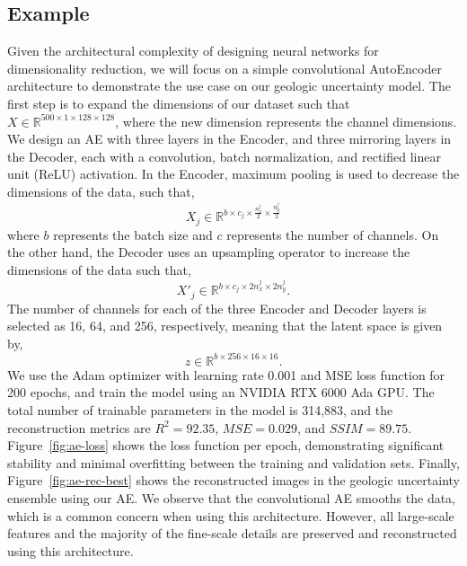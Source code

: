 \documentclass[a4paper,fleqn,12pt]{article}
\begin{document}
\subsection*{Example}
Given the architectural complexity of designing neural networks for dimensionality reduction, we will focus on a simple convolutional AutoEncoder architecture to demonstrate the use case on our geologic uncertainty model. The first step is to expand the dimensions of our dataset such that $X\in\mathbb{R}^{500\times1\times128\times128}$, where the new dimension represents the channel dimensions. We design an AE with three layers in the Encoder, and three mirroring layers in the Decoder, each with a convolution, batch normalization, and rectified linear unit (ReLU) activation. In the Encoder, maximum pooling is used to decrease the dimensions of the data, such that,
\begin{equation}
    X_{j}\in\mathbb{R}^{b\times c_j \times \frac{n_x^j}{2} \times \frac{n_y^j}{2}}    
\end{equation}
where $b$ represents the batch size and $c$ represents the number of channels. On the other hand, the Decoder uses an upsampling operator to increase the dimensions of the data such that,
\begin{equation}
    X'_j\in\mathbb{R}^{b \times c_j \times 2n_x^j \times 2n_y^j} .
\end{equation}
The number of channels for each of the three Encoder and Decoder layers is selected as 16, 64, and 256, respectively, meaning that the latent space is given by,
\begin{equation}
    z\in\mathbb{R}^{b\times 256\times16\times16} .    
\end{equation}
We use the Adam optimizer with learning rate 0.001 and MSE loss function for 200 epochs, and train the model using an NVIDIA RTX 6000 Ada GPU. The total number of trainable parameters in the model is 314,883, and the reconstruction metrics are $R^2=92.35$, $MSE=0.029$, and $SSIM=89.75$. Figure~\ref{fig:ae-loss} shows the loss function per epoch, demonstrating significant stability and minimal overfitting between the training and validation sets. Finally, Figure~\ref{fig:ae-rec-best} shows the reconstructed images in the geologic uncertainty ensemble using our AE. We observe that the convolutional AE smooths the data, which is a common concern when using this architecture. However, all large-scale features and the majority of the fine-scale details are preserved and reconstructed using this architecture.
\end{document}
